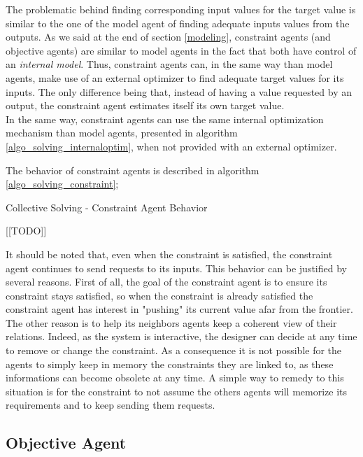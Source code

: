 The problematic behind finding corresponding input values for the target value is similar to the one of the model agent of finding adequate inputs values from the outputs. As we said at the end of section \ref{modeling}, constraint agents (and objective agents) are similar to model agents in the fact that both have control of an \emph{internal model}. Thus, constraint agents can, in the same way than model agents, make use of an external optimizer to find adequate target values for its inputs. The only difference being that, instead of having a value requested by an output, the constraint agent estimates itself its own target value.\\
In the same way, constraint agents can use the same internal optimization mechanism than model agents, presented in algorithm \ref{algo_solving_internaloptim},  when not provided with an external optimizer.

The behavior of constraint agents is described in algorithm \ref{algo_solving_constraint};

\begin{algorithm}
\caption{Collective Solving - Constraint Agent Behavior}
\label{algo_solving_constraint}

	[[TODO]]\;
	
\end{algorithm}

It should be noted that, even when the constraint is satisfied, the constraint agent continues to send requests to its inputs. This behavior can be justified by several reasons.  First of all, the goal of the constraint agent is to ensure its constraint stays satisfied, so when the constraint is already  satisfied the constraint agent has interest in "pushing" its current value afar from the frontier.\\
The other reason is to help its neighbors agents keep a coherent view of their relations. Indeed, as the system is interactive, the designer can decide at any time to remove or change the constraint. As a consequence it is not possible for the agents to simply keep in memory the constraints they are linked to, as these informations can become obsolete at any time. A simple way to remedy to this situation is for the constraint to not assume the others agents will memorize its requirements and to keep sending them requests.

\subsection{Objective Agent}

